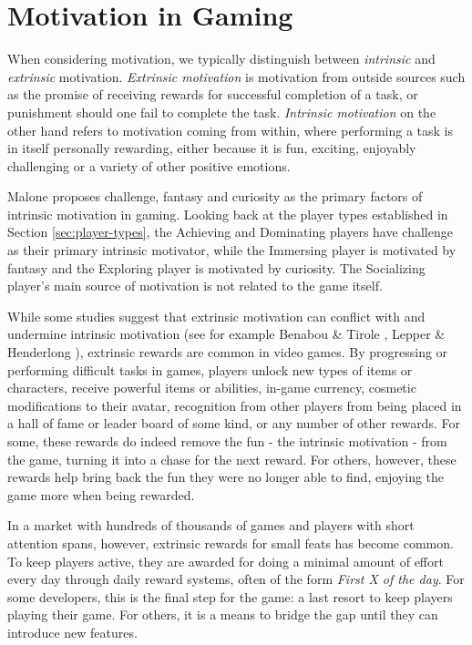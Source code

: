 
\section{Motivation in Gaming}
\label{sec:motivation-in-gaming}

When considering motivation, we typically distinguish between \emph{intrinsic} and \emph{extrinsic} motivation. \emph{Extrinsic motivation} is motivation from outside sources such as the promise of receiving rewards for successful completion of a task, or punishment should one fail to complete the task. \emph{Intrinsic motivation} on the other hand refers to motivation coming from within, where performing a task is in itself personally rewarding, either because it is fun, exciting, enjoyably challenging or a variety of other positive emotions.

Malone \cite{malone1981toward} proposes challenge, fantasy and curiosity as the primary factors of intrinsic motivation in gaming. Looking back at the player types established in Section \ref{sec:player-types}, the Achieving and Dominating players have challenge as their primary intrinsic motivator, while the Immersing player is motivated by fantasy and the Exploring player is motivated by curiosity. The Socializing player's main source of motivation is not related to the game itself.

While some studies suggest that extrinsic motivation can conflict with and undermine intrinsic motivation (see for example Benabou \& Tirole \cite{benabou2003intrinsic}, Lepper \& Henderlong \cite{lepper2000motivation}), extrinsic rewards are common in video games. By progressing or performing difficult tasks in games, players unlock new types of items or characters, receive powerful items or abilities, in-game currency, cosmetic modifications to their avatar, recognition from other players from being placed in a hall of fame or leader board of some kind, or any number of other rewards. For some, these rewards do indeed remove the fun - the intrinsic motivation - from the game, turning it into a chase for the next reward. For others, however, these rewards help bring back the fun they were no longer able to find, enjoying the game more when being rewarded.

In a market with hundreds of thousands of games and players with short attention spans, however, extrinsic rewards for small feats has become common. To keep players active, they are awarded for doing a minimal amount of effort every day through daily reward systems, often of the form \emph{First X of the day}. For some developers, this is the final step for the game: a last resort to keep players playing their game. For others, it is a means to bridge the gap until they can introduce new features.

